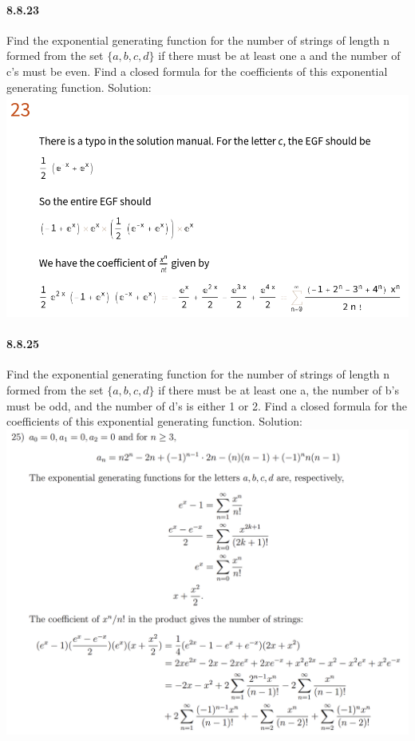 \documentclass{article}
\begin{document}
\paragraph{8.8.23}Find the exponential generating function for the number of strings of length n
formed from the set $\{a, b, c, d\}$ if there must be at least one a and the number of c’s
must be even. Find a closed formula for the coefficients of this exponential generating
function.\newline
Solution:\newline
\includegraphics{8.8.23}
\paragraph{8.8.25}
Find the exponential generating function for the number of strings of length n
formed from the set $\{a, b, c, d\}$ if there must be at least one a, the number of b’s must
be odd, and the number of d’s is either 1 or 2. Find a closed formula for the coefficients
of this exponential generating function.\newline
Solution:\newline
\includegraphics{0044}
\end{document}
